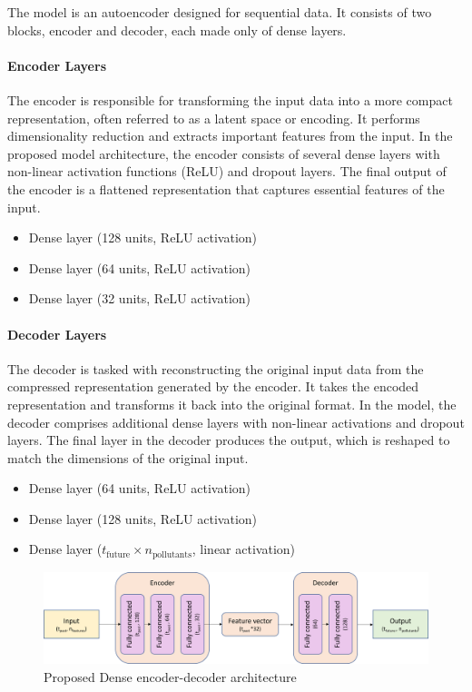 The model is an autoencoder designed for sequential data. It consists of two blocks, encoder and decoder, each made only of dense layers.

\paragraph{Encoder Layers}
The encoder is responsible for transforming the input data into a more compact representation, often referred to as a latent space or encoding. It performs dimensionality reduction and extracts important features from the input. In the proposed model architecture, the encoder consists of several dense layers with non-linear activation functions (ReLU) and dropout layers. The final output of the encoder is a flattened representation that captures essential features of the input.
\begin{itemize}[noitemsep]
  \item Dense layer (128 units, ReLU activation)
  \item Dense layer (64 units, ReLU activation)
  \item Dense layer (32 units, ReLU activation)
\end{itemize}

\paragraph{Decoder Layers}
The decoder is tasked with reconstructing the original input data from the compressed representation generated by the encoder. It takes the encoded representation and transforms it back into the original format. In the model, the decoder comprises additional dense layers with non-linear activations and dropout layers. The final layer in the decoder produces the output, which is reshaped to match the dimensions of the original input.
\begin{itemize}[noitemsep]
  \item Dense layer (64 units, ReLU activation)
  \item Dense layer (128 units, ReLU activation)
  \item Dense layer (\( t_{\text{future}} \times n_{\text{pollutants}} \), linear activation)
\end{itemize}

\begin{figure}
    \centering
    \includegraphics[width=1\linewidth]{images/model architectures/denseencdecmodel.png}
    \caption{Proposed Dense encoder-decoder architecture}
    \label{fig:denseencdecmodel}
\end{figure}


